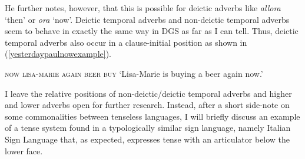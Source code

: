 He further notes, however, that this is possible for deictic adverbs like \textit{allora} `then' or \textit{ora} `now'. Deictic temporal adverbs and non-deictic temporal adverbs seem to behave in exactly the same way in DGS as far as I can tell. Thus, deictic temporal adverbs also occur in a clause-initial position as shown in (\ref{yesterdaypaulnowexample}).

\begin{exe}
\ex \textsc{now lisa-marie again beer buy} \label{yesterdaypaulnowexample}
\glt `Lisa-Marie is buying a beer again now.'
\end{exe}

\noindent I leave the relative positions of non-deictic/deictic temporal adverbs and higher and lower adverbs open for further research. Instead, after a short side-note on some commonalities between tenseless languages, I will briefly discuss an example of a tense system found in a typologically similar sign language, namely Italian Sign Language that, as expected, expresses tense with an articulator below the lower face.


